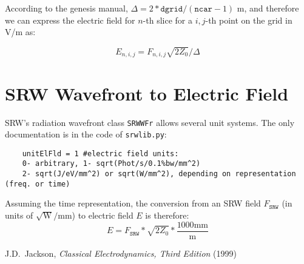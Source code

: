 \documentclass{article}
\begin{document}
According to the {\sc genesis} manual, $\Delta = 2 * \texttt{dgrid} / (\texttt{ncar}-1)$ m, and therefore we can express the electric field for $n$-th slice for a $i,j$-th point on the grid in V/m as:

\begin{equation}
 E_{n,i,j} =  F_{n,i,j} \sqrt{2 Z_0}/\Delta
\end{equation}

\section{SRW Wavefront to Electric Field}

SRW's radiation wavefront class \texttt{SRWWFr} allows several unit systems. The only documentation is in the code of \texttt{srwlib.py}:
\begin{verbatim}
    unitElFld = 1 #electric field units:
    0- arbitrary, 1- sqrt(Phot/s/0.1%bw/mm^2)
    2- sqrt(J/eV/mm^2) or sqrt(W/mm^2), depending on representation (freq. or time)
\end{verbatim}

Assuming the time representation, the conversion from an SRW field $F_\texttt{SRW}$ (in units of $\sqrt{\textrm{W}}/\textrm{mm}$) to electric field $E$ is therefore:
\begin{equation}
    E = F_\texttt{SRW} *  \sqrt{2 Z_0} * \frac{1000\textrm{mm}}{\textrm{m}}
\end{equation}




J.D.~Jackson, \emph{Classical Electrodynamics, Third Edition} (1999)
\end{document}
